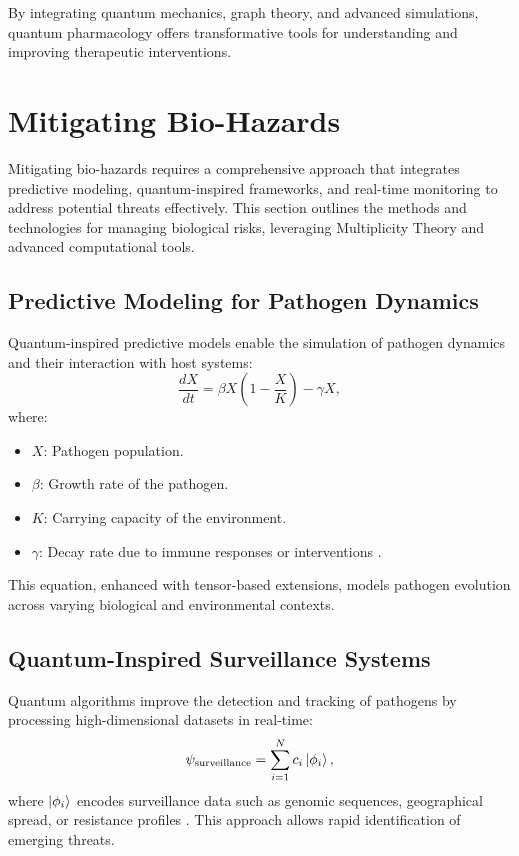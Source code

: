 \documentclass{article}
\theoremstyle{plain}
\begin{document}
By integrating quantum mechanics, graph theory, and advanced simulations, quantum pharmacology offers transformative tools for understanding and improving therapeutic interventions.

\section{Mitigating Bio-Hazards}
\label{sec:mitigating_biohazards}

Mitigating bio-hazards requires a comprehensive approach that integrates predictive modeling, quantum-inspired frameworks, and real-time monitoring to address potential threats effectively. This section outlines the methods and technologies for managing biological risks, leveraging Multiplicity Theory and advanced computational tools.

\subsection{Predictive Modeling for Pathogen Dynamics}
Quantum-inspired predictive models enable the simulation of pathogen dynamics and their interaction with host systems:
\begin{equation}
\frac{dX}{dt} = \beta X (1 - \frac{X}{K}) - \gamma X,
\end{equation}
where:
\begin{itemize}
    \item $X$: Pathogen population.
    \item $\beta$: Growth rate of the pathogen.
    \item $K$: Carrying capacity of the environment.
    \item $\gamma$: Decay rate due to immune responses or interventions \cite{pathogenDynamics2023}.
\end{itemize}
This equation, enhanced with tensor-based extensions, models pathogen evolution across varying biological and environmental contexts.

\subsection{Quantum-Inspired Surveillance Systems}
Quantum algorithms improve the detection and tracking of pathogens by processing high-dimensional datasets in real-time:
\begin{equation}
\psi_{\text{surveillance}} = \sum_{i=1}^{N} c_i \ket{\phi_i},
\end{equation}
where $\ket{\phi_i}$ encodes surveillance data such as genomic sequences, geographical spread, or resistance profiles \cite{quantumSurveillance2022}. This approach allows rapid identification of emerging threats.
\end{document}
